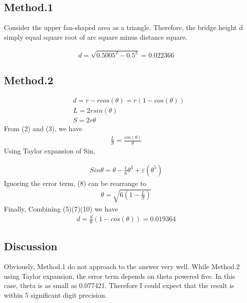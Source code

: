 \documentclass[12pt]{article}
\begin{document}
\subsection*{Method.1}
Consider the upper fan-shaped area as a triangle. Therefore, the bridge height d simply equal square root of arc square minus distance square.

\begin{eqnarray}
d  = \sqrt{0.5005^2 - 0.5^2}   = 0.022366
\end{eqnarray}
\subsection*{Method.2}
\begin{eqnarray}
&d = r-rcos(\theta)=r(1-cos(\theta))\\
&L = 2rsin(\theta)\\
&S = 2r\theta
\end{eqnarray}
From (2) and (3), we have
\begin{eqnarray}
	\frac{L}{S}=\frac{sin(\theta)}{\theta}
\end{eqnarray}
Using Taylor expansion of Sin,

\begin{eqnarray}
Sin\theta=\theta-\frac{1}{6}\theta^3+\varepsilon(\theta^5)
\end{eqnarray}
Ignoring the error term, (8) can be rearrange to 
\begin{eqnarray}
\theta=\sqrt{6(1-\frac{L}{S})}
\end{eqnarray}
Finally, Combining (5)(7)(10) we have
\begin{eqnarray}
d = \frac{S}{\theta}(1-cos(\theta))=0.019364
\end{eqnarray}

\subsection{Discussion}
Obviously, Method.1 do not approach to the answer very well. While Method.2 using Taylor expansion, the error term depends on theta powered five. In this case, theta is as small as 0.077421. Therefore I could expect that the result is within 5 significant digit precision.
\end{document}
